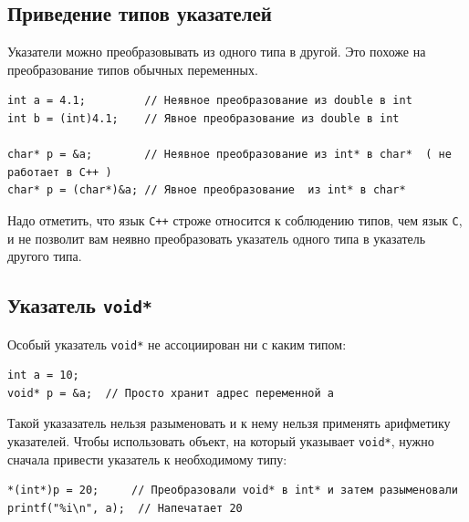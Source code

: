 \documentclass[10pt]{article}
\begin{document}
\subsection*{Приведение типов указателей}
Указатели можно преобразовывать из одного типа в другой. Это похоже на преобразование типов обычных переменных.
\begin{lstlisting}
int a = 4.1;         // Неявное преобразование из double в int
int b = (int)4.1;    // Явное преобразование из double в int

char* p = &a;        // Неявное преобразование из int* в char*  ( не работает в C++ )
char* p = (char*)&a; // Явное преобразование  из int* в char*
\end{lstlisting}
Надо отметить, что язык \texttt{C++} строже относится к соблюдению типов, чем язык \texttt{C}, и не позволит вам неявно преобразовать указатель одного типа в указатель другого типа.


\subsection*{Указатель \texttt{void*}}
Особый указатель \texttt{void*} не ассоциирован ни с каким типом:
\begin{lstlisting}
int a = 10;
void* p = &a;  // Просто хранит адрес переменной a
\end{lstlisting}
Такой указазатель нельзя разыменовать и к нему нельзя применять арифметику указателей.
Чтобы использовать объект, на который указывает \texttt{void*}, нужно сначала привести указатель к необходимому типу:
\begin{lstlisting}
*(int*)p = 20;     // Преобразовали void* в int* и затем разыменовали
printf("%i\n", a);  // Напечатает 20
\end{lstlisting}
\end{document}
